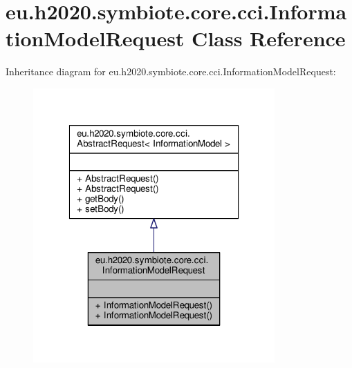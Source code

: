 \hypertarget{classeu_1_1h2020_1_1symbiote_1_1core_1_1cci_1_1InformationModelRequest}{}\section{eu.\+h2020.\+symbiote.\+core.\+cci.\+Information\+Model\+Request Class Reference}
\label{classeu_1_1h2020_1_1symbiote_1_1core_1_1cci_1_1InformationModelRequest}


Inheritance diagram for eu.\+h2020.\+symbiote.\+core.\+cci.\+Information\+Model\+Request\+:\nopagebreak
\begin{figure}[H]
\begin{center}
\leavevmode
\includegraphics[width=262pt]{classeu_1_1h2020_1_1symbiote_1_1core_1_1cci_1_1InformationModelRequest__inherit__graph}
\end{center}
\end{figure}



